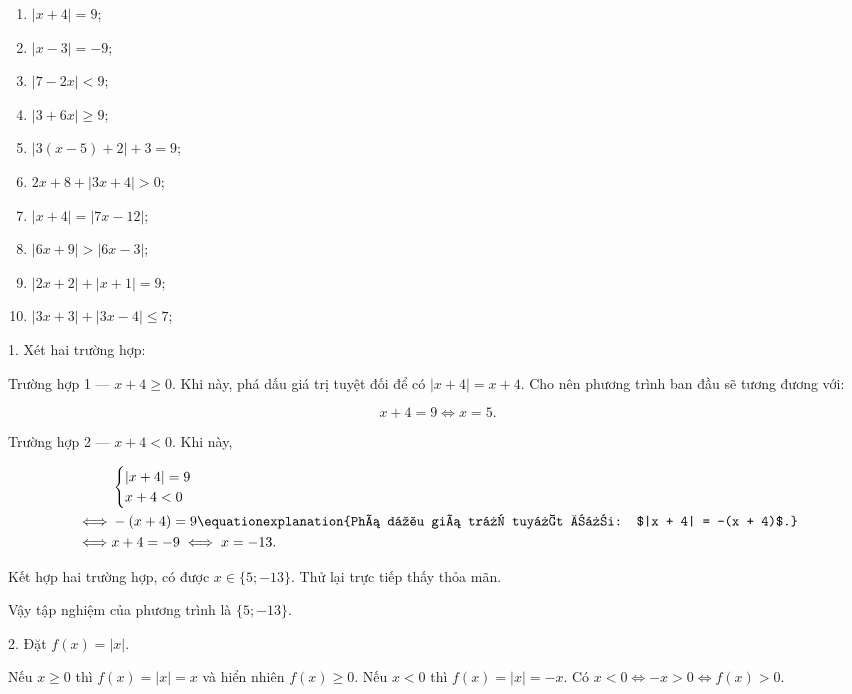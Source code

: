 \begin{multicols}{2}
   \begin{enumerate}
      \item $|x + 4| = 9$;
      \item $|x - 3| = -9$;
      \item $|7 - 2x| < 9$;
      \item $|3 + 6x| \geq 9$;
      \item $\left|3(x - 5) + 2\right| + 3 = 9$;
      \item $2x + 8 + |3x + 4| > 0$;
      \item $|x + 4| = |7x - 12|$;
      \item $|6x + 9| > |6x - 3|$;
      \item $|2x + 2| + |x + 1| = 9$;
      \item $|3x + 3| + |3x - 4| \leq 7$;
   \end{enumerate}
\end{multicols}

\solution

1. Xét hai trường hợp:

\textcolor{colorEmphasisCyan}{Trường hợp 1 --- $x + 4 \geq 0$}. Khi này, phá dấu giá trị tuyệt đối để có $|x + 4| = x + 4$. Cho nên phương trình ban đầu sẽ tương đương với:

\begin{equation*}
   x + 4 = 9 \iff x = 5.
\end{equation*}

\textcolor{colorEmphasis}{Trường hợp 2 --- $x + 4 < 0$}. Khi này,

\begin{align*}
   &\begin{cases}
      |x + 4| = 9 \\
      x + 4 < 0
   \end{cases} \\
   \iff &-(x + 4) = 9 \equationexplanation{Phá dấu giá trị tuyệt đối: $|x + 4| = -(x + 4)$.}\\
   \iff &x + 4 = -9 \iff x = -13.
\end{align*}

Kết hợp hai trường hợp, có được $x \in \{5; -13\}$. Thử lại trực tiếp thấy thỏa mãn.

Vậy tập nghiệm của phương trình là $\{5; -13\}$.

2. Đặt $f(x) = |x|$.

Nếu \textcolor{colorEmphasisCyan}{$x \geq 0$} thì $f(x) = |x| = x$ và hiển nhiên $f(x) \geq 0$. Nếu \textcolor{colorEmphasis}{$x < 0$} thì $f(x) = |x| = -x$. Có $x < 0 \iff -x > 0 \iff f(x) > 0$.

